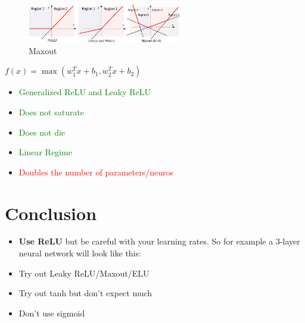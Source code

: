 \begin{figure}[!htb]
  \centering
  \includegraphics[width=0.6\textwidth]{Images/activation_f/7.jpg}
  \caption{Maxout}
\end{figure}
$f(x) = \max(w_1^Tx+b_1,w_2^Tx+b_2)$
\begin{itemize}
\item \textcolor{green}{Generalized ReLU and Leaky ReLU}
\item \textcolor{green}{Does not saturate}
\item \textcolor{green}{Does not die}
\item \textcolor{green}{Linear Regime}

\item \textcolor{red}{Doubles the number of parameters/neuros}
\end{itemize}

\section*{Conclusion}
\begin{itemize}
\item \textbf{Use ReLU} but be careful with your learning rates. So for example a 3-layer neural network will look like this:
\item Try out Leaky ReLU/Maxout/ELU
\item Try out tanh but don't expect much
\item Don't use sigmoid
\end{itemize}
